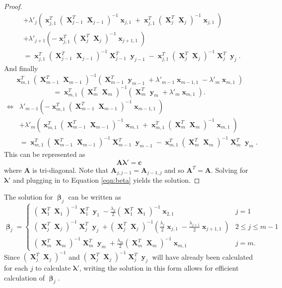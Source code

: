 \documentclass[12pt]{article}
\DeclareMathOperator{\bx}{\mathbf{x}}
\DeclareMathOperator{\bX}{\mathbf{X}}
\DeclareMathOperator{\by}{\mathbf{y}}
\DeclareMathOperator{\bbeta}{\boldsymbol{\beta}}
\begin{document}
\begin{proof}
\begin{align*}
& +  \lambda'_j \left(\bx_{j,1}^T(\bX_{j-1}^T  \bX_{j-1})^{-1}\bx_{j, 1}+\bx_{j,1}^T(\bX_j^T  \bX_j)^{-1}\bx_{j, 1}\right) \\
& +  \lambda'_{j+1}\left(-\bx_{j,1}^T(\bX_j^T  \bX_j)^{-1}\bx_{j+1, 1}\right) \\
& =\bx_{j,1}^T(\bX_{j-1}^T  \bX_{j-1})^{-1}\bX_{j-1}^T\by_{j-1}-\bx_{j,1}^T(\bX_j^T  \bX_j)^{-1} \bX_j^T \by_j.
\end{align*}
And finally
$$\bx_{m,1}^T(\bX_{m-1}^T  \bX_{m-1})^{-1}\left(\bX_{m-1}^T \by_{m-1} + \lambda'_{m-1}\bx_{m-1, 1}-\lambda'_{m}\bx_{m, 1}\right) $$
$$= \bx_{m,1}^T(\bX_m^T  \bX_m)^{-1} \left( \bX_m^T \by_m + \lambda'_{m}\bx_{m, 1} \right).$$
\begin{align*}
\iff & \lambda'_{m-1}\left(-\bx_{m,1}^T(\bX_{m-1}^T  \bX_{m-1})^{-1}\bx_{m-1, 1}\right) \\
& + \lambda'_m\left(\bx_{m,1}^T(\bX_{m-1}^T  \bX_{m-1})^{-1}\bx_{m, 1}+\bx_{m,1}^T(\bX_m^T \bX_m)^{-1}\bx_{m, 1} \right) \\
& = \bx_{m,1}^T(\bX_{m-1}^T  \bX_{m-1})^{-1}\bX_{m-1}^T \by_{m-1}-\bx_{m,1}^T(\bX_m^T \bX_m)^{-1}\bX_m^T\by_m.
\end{align*}
This can be represented as 
$$\mathbf{A} \boldsymbol{\lambda}'=\mathbf{c}$$
where $\mathbf{A}$ is tri-diagonal. Note that $\mathbf{A}_{j, j-1}=\mathbf{A}_{j-1,j}$ and so $\mathbf{A}^T=\mathbf{A}$. Solving for $\boldsymbol{\lambda}'$ and plugging in to Equation \ref{eqn:beta} yields the solution.
\end{proof}
The solution for $\bbeta_j$ can be written as
$$\bbeta_j=\begin{cases}
(\bX_1^T  \bX_1)^{-1}\bX_1^T \by_1 -\frac{\lambda_{2}}{2}(\bX_1^T  \bX_1)^{-1}\bx_{2, 1} & j=1 \\
(\bX_j^T  \bX_j)^{-1}\bX_j^T \by_j + (\bX_j^T  \bX_j)^{-1}(\frac{\lambda_j}{2}\bx_{j, 1}-\frac{\lambda_{j+1}}{2}\bx_{j+1, 1}) & 2 \leq j \leq m-1 \\
(\bX_m^T \bX_m)^{-1}\bX_m^T \by_m + \frac{\lambda_m}{2}(\bX_m^T \bX_m)^{-1}\bx_{m, 1} & j=m.
\end{cases}$$
Since $(\bX_j^T  \bX_j)^{-1}$ and $(\bX_j^T  \bX_j)^{-1}\bX_j^T \by_j$ will have already been calculated for each $j$ to calculate $\boldsymbol{\lambda}'$, writing the solution in this form allows for efficient calculation of $\bbeta_j$. \\ \\
\end{document}
